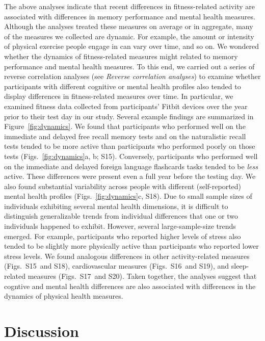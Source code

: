 \documentclass[10pt]{article}
\newcommand{\activityTimecourse}{S15}
\newcommand{\cardioTimecourse}{S16}
\newcommand{\sleepTimecourse}{S17}
\newcommand{\activityTimecourseMH}{S18}
\newcommand{\cardioTimecourseMH}{S19}
\newcommand{\sleepTimecourseMH}{S20}
\begin{document}
The above analyses indicate that recent differences in fitness-related
activity are associated with differences in memory performance and
mental health measures.  Although the analyses treated these measures
on average or in aggregate, many of the measures we collected are
dynamic. For example, the amount or intensity of physical exercise
people engage in can vary over time, and so on.  We wondered whether
the dynamics of fitness-related measures might related to memory
performance and mental health measures.  To this end, we carried out a
series of reverse correlation analyses (see \textit{Reverse
  correlation analyses}) to examine whether participants with
different cognitive or mental health profiles also tended to display
differences in fitness-related measures over time.  In particular, we
examined fitness data collected from participants' Fitbit devices over
the year prior to their test day in our study.  Several example findings are summarized in
Figure~\ref{fig:dynamics}.  We found that participants who performed
well on the immediate and delayed free recall memory tests and on the
naturalistic recall tests tended to be more active than participants
who performed poorly on those tests (Figs.~\ref{fig:dynamics}a, b;
\activityTimecourse).  Conversely, participants who performed well on
the immediate and delayed foreign language flashcards tasks tended to
be \textit{less} active.  These differences were present even a full
year before the testing day.  We also found substantial variability
across people with different (self-reported) mental health profiles
(Figs.~\ref{fig:dynamics}c, \activityTimecourseMH).  Due to small sample
sizes of individuals exhibiting several mental health dimensions, it
is difficult to distinguish generalizable trends from individual
differences that one or two individuals happened to exhibit.  However,
several large-sample-size trends emerged.  For example, participants
who reported higher levels of stress also tended to be slightly more
physically active than participants who reported lower stress levels.
We found analogous differences in other activity-related measures
(Figs.~\activityTimecourse~and \activityTimecourseMH), cardiovascular
measures (Figs.~\cardioTimecourse~and \cardioTimecourseMH), and
sleep-related measures (Figs.~\sleepTimecourse~and
\sleepTimecourseMH).  Taken together, the analyses suggest that
cogntive and mental health differences are also associated with differences
in the dynamics of physical health measures.


\section*{Discussion}
\end{document}
